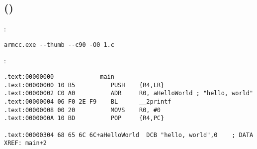 \subsection{\NonOptimizingKeilVI (\ThumbMode)}

:

\begin{lstlisting}
armcc.exe --thumb --c90 -O0 1.c 
\end{lstlisting}

:

\begin{lstlisting}[caption=\NonOptimizingKeilVI (\ThumbMode) + \IDA]
.text:00000000             main
.text:00000000 10 B5          PUSH    {R4,LR}
.text:00000002 C0 A0          ADR     R0, aHelloWorld ; "hello, world"
.text:00000004 06 F0 2E F9    BL      __2printf
.text:00000008 00 20          MOVS    R0, #0
.text:0000000A 10 BD          POP     {R4,PC}

.text:00000304 68 65 6C 6C+aHelloWorld  DCB "hello, world",0    ; DATA XREF: main+2
\end{lstlisting}

